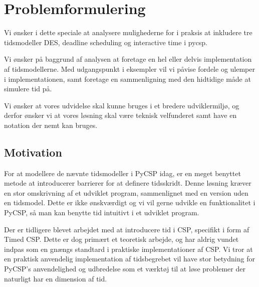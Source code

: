 
\section*{Problemformulering}

Vi ønsker i dette speciale at analysere mulighederne for i praksis at inkludere tre tidsmodeller DES, deadline scheduling og interactive time i pycsp.

Vi ønsker på baggrund af analysen at foretage en hel eller delvis implementation af tidsmodellerne. Med udgangspunkt i eksempler vil vi påvise fordele og ulemper i implementationen, samt foretage en sammenligning med den hidtidige måde at simulere tid på.

Vi ønsker at vores udvidelse skal kunne bruges i et bredere udviklermiljø, og derfor ønsker vi at vores løsning skal være teknisk velfunderet samt have en notation der nemt kan bruges.

\subsection*{Motivation}
For at modellere de nævnte tidsmodeller i PyCSP idag, er en meget benyttet metode at introducerer barrierer for at definere tidsskridt. Denne løsning kræver en stor omskrivning af et udviklet program, sammenlignet med en version uden en tidsmodel. Dette er ikke ønskværdigt og vi vil gerne udvikle en funktionalitet i PyCSP, så man kan benytte tid intuitivt i et udviklet program.

Der er tidligere blevet arbejdet med at introducere tid i CSP, specifikt i form af Timed CSP. Dette er dog primært et teoretisk arbejde, og har aldrig vundet indpas som en gnængs standtard i praktiske implementationer af CSP. 
Vi tror at en praktisk anvendelig implementation af tidsbegrebet vil have stor betydning for PyCSP's anvendelighed og udbredelse som et værktøj til at løse problemer der naturligt har en dimension af tid. 


